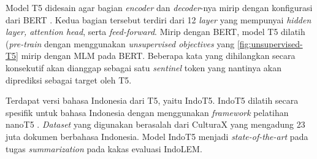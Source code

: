 Model T5 didesain agar bagian \textit{encoder} dan \textit{decoder}-nya mirip dengan konfigurasi dari BERT \parencite{T5}. Kedua bagian tersebut terdiri dari 12 \textit{layer} yang mempunyai \textit{hidden layer, attention head}, serta \textit{feed-forward}. Mirip dengan BERT, model T5 dilatih (\textit{pre-train} dengan menggunakan \textit{unsupervised objectives} yang \ref{fig:unsupervised-T5} mirip dengan MLM pada BERT. Beberapa kata yang dihilangkan secara konsekutif akan dianggap sebagai satu \textit{sentinel} token yang nantinya akan diprediksi sebagai target oleh T5.

Terdapat versi bahasa Indonesia dari T5, yaitu IndoT5. IndoT5 dilatih secara spesifik untuk bahasa Indonesia dengan menggunakan \textit{framework} pelatihan nanoT5 \parencite{indoT5}. \textit{Dataset} yang digunakan berasalah dari CulturaX yang mengadung 23 juta dokumen berbahasa Indonesia. Model IndoT5 menjadi \textit{state-of-the-art} pada tugas \textit{summarization} pada kakas evaluasi IndoLEM.
